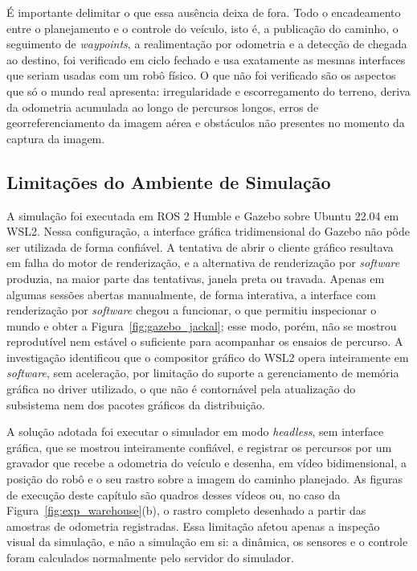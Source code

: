 \documentclass[
    12pt,
    openright,
    oneside,
    a4paper,
    english,
    brazil
]{abntex2}
\begin{document}
É importante delimitar o que essa ausência deixa de fora. Todo o encadeamento entre o planejamento e o controle do veículo, isto é, a publicação do caminho, o seguimento de \textit{waypoints}, a realimentação por odometria e a detecção de chegada ao destino, foi verificado em ciclo fechado e usa exatamente as mesmas interfaces que seriam usadas com um robô físico. O que não foi verificado são os aspectos que só o mundo real apresenta: irregularidade e escorregamento do terreno, deriva da odometria acumulada ao longo de percursos longos, erros de georreferenciamento da imagem aérea e obstáculos não presentes no momento da captura da imagem.

\subsection{Limitações do Ambiente de Simulação}
\label{sec:lim_sim}

A simulação foi executada em ROS 2 Humble e Gazebo sobre Ubuntu 22.04 em WSL2. Nessa configuração, a interface gráfica tridimensional do Gazebo não pôde ser utilizada de forma confiável. A tentativa de abrir o cliente gráfico resultava em falha do motor de renderização, e a alternativa de renderização por \textit{software} produzia, na maior parte das tentativas, janela preta ou travada. Apenas em algumas sessões abertas manualmente, de forma interativa, a interface com renderização por \textit{software} chegou a funcionar, o que permitiu inspecionar o mundo e obter a Figura~\ref{fig:gazebo_jackal}; esse modo, porém, não se mostrou reprodutível nem estável o suficiente para acompanhar os ensaios de percurso. A investigação identificou que o compositor gráfico do WSL2 opera inteiramente em \textit{software}, sem aceleração, por limitação do suporte a gerenciamento de memória gráfica no driver utilizado, o que não é contornável pela atualização do subsistema nem dos pacotes gráficos da distribuição.

A solução adotada foi executar o simulador em modo \textit{headless}, sem interface gráfica, que se mostrou inteiramente confiável, e registrar os percursos por um gravador que recebe a odometria do veículo e desenha, em vídeo bidimensional, a posição do robô e o seu rastro sobre a imagem do caminho planejado. As figuras de execução deste capítulo são quadros desses vídeos ou, no caso da Figura~\ref{fig:exp_warehouse}(b), o rastro completo desenhado a partir das amostras de odometria registradas. Essa limitação afetou apenas a inspeção visual da simulação, e não a simulação em si: a dinâmica, os sensores e o controle foram calculados normalmente pelo servidor do simulador.
\end{document}
